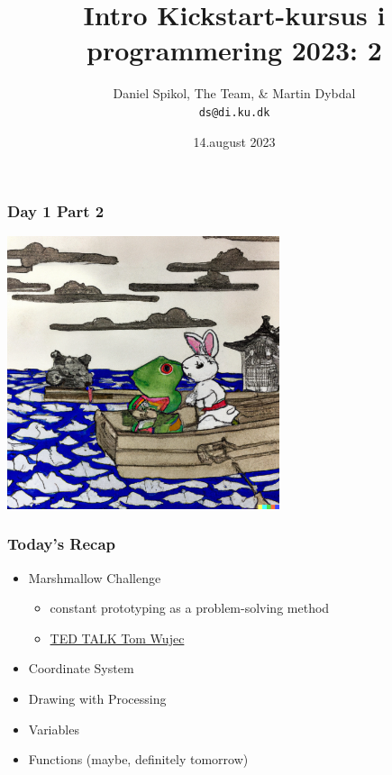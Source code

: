 \documentclass[10pt]{beamer}
\title[Kickstart-kursus] %
  {Intro Kickstart-kursus i programmering 2023: 2} %
\author{\footnotesize{Daniel Spikol, The Team, \& Martin Dybdal}\\
          \footnotesize{\texttt{ds@di.ku.dk}}}
\institute {
DIKU \\ Københavns Universitet
}
\date[14. august 2023]{14.august 2023}
\begin{document}
\begin{frame}[plain]
\titlepage
\end{frame}


\begin{frame}
\frametitle{Day 1 Part 2}
  \includegraphics[height=8cm]{images/rabfro}
\end{frame}


\begin{frame}
   \frametitle{Today's Recap}
   	\begin{itemize}
	\item Marshmallow Challenge
	\begin{itemize}
	\item constant prototyping as a problem-solving method
	\item \href{https://www.ted.com/talks/tom_wujec_build_a_tower_build_a_team?utm_campaign=tedspread&utm_medium=referral&utm_source=tedcomshare}{TED TALK Tom Wujec}
	\end{itemize}
	\item Coordinate System 
	\item Drawing with Processing
	\item Variables
	\item Functions (maybe, definitely tomorrow)
	\end{itemize}
\end{frame}

\end{document}
